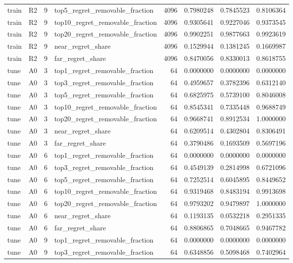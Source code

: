 \begin{tabular}{llrlrrrr}
train & R2 & 9 & top5_regret_removable_fraction & 4096 & 0.7980248 & 0.7845523 & 0.8106364 \\
train & R2 & 9 & top10_regret_removable_fraction & 4096 & 0.9305641 & 0.9227046 & 0.9373545 \\
train & R2 & 9 & top20_regret_removable_fraction & 4096 & 0.9902251 & 0.9877663 & 0.9923619 \\
train & R2 & 9 & near_regret_share & 4096 & 0.1529944 & 0.1381245 & 0.1669987 \\
train & R2 & 9 & far_regret_share & 4096 & 0.8470056 & 0.8330013 & 0.8618755 \\
tune & A0 & 3 & top1_regret_removable_fraction & 64 & 0.0000000 & 0.0000000 & 0.0000000 \\
tune & A0 & 3 & top3_regret_removable_fraction & 64 & 0.4959657 & 0.3782396 & 0.6312140 \\
tune & A0 & 3 & top5_regret_removable_fraction & 64 & 0.6825975 & 0.5739100 & 0.8046008 \\
tune & A0 & 3 & top10_regret_removable_fraction & 64 & 0.8545341 & 0.7335448 & 0.9688749 \\
tune & A0 & 3 & top20_regret_removable_fraction & 64 & 0.9668741 & 0.8912534 & 1.0000000 \\
tune & A0 & 3 & near_regret_share & 64 & 0.6209514 & 0.4302804 & 0.8306491 \\
tune & A0 & 3 & far_regret_share & 64 & 0.3790486 & 0.1693509 & 0.5697196 \\
tune & A0 & 6 & top1_regret_removable_fraction & 64 & 0.0000000 & 0.0000000 & 0.0000000 \\
tune & A0 & 6 & top3_regret_removable_fraction & 64 & 0.4549139 & 0.2814998 & 0.6721096 \\
tune & A0 & 6 & top5_regret_removable_fraction & 64 & 0.7252514 & 0.6045895 & 0.8449652 \\
tune & A0 & 6 & top10_regret_removable_fraction & 64 & 0.9319468 & 0.8483194 & 0.9913698 \\
tune & A0 & 6 & top20_regret_removable_fraction & 64 & 0.9793202 & 0.9479897 & 1.0000000 \\
tune & A0 & 6 & near_regret_share & 64 & 0.1193135 & 0.0532218 & 0.2951335 \\
tune & A0 & 6 & far_regret_share & 64 & 0.8806865 & 0.7048665 & 0.9467782 \\
tune & A0 & 9 & top1_regret_removable_fraction & 64 & 0.0000000 & 0.0000000 & 0.0000000 \\
tune & A0 & 9 & top3_regret_removable_fraction & 64 & 0.6348856 & 0.5098468 & 0.7402964 \\

\end{tabular}
